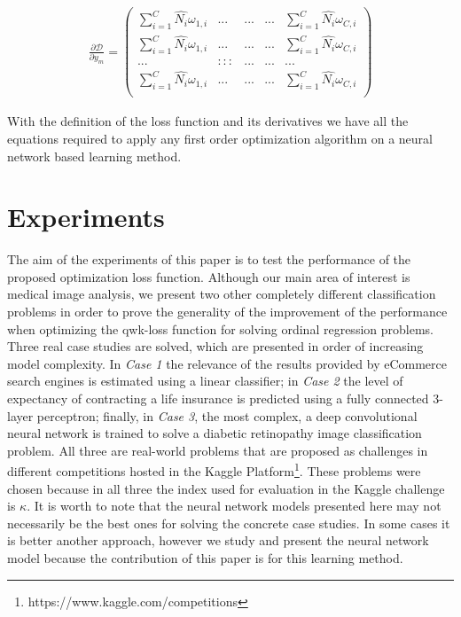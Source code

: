 \documentclass[times,twocolumn,final,authoryear]{elsarticle}
\begin{document}
\begin{equation}
\begin{aligned}
\frac{\partial \mathcal{D}}{\partial y_m} =
\begin{pmatrix} 
\sum_{i=1}^C \hat{N_i} \omega_{1,i} & ...  & ...     & ... & \sum_{i=1}^C \hat{N_i} \omega_{C,i}\\
\sum_{i=1}^C \hat{N_i} \omega_{1,i} & ...  & ...     & ... & \sum_{i=1}^C \hat{N_i} \omega_{C,i}\\
... & ::: & ... & ... & ...\\
\sum_{i=1}^C \hat{N_i} \omega_{1,i} & ...  & ...     & ... & \sum_{i=1}^C \hat{N_i} \omega_{C,i}\\ 
\end{pmatrix}
\end{aligned}
\end{equation}

With the definition of the loss function and its derivatives we have all the equations required to apply any first order optimization algorithm on a neural network based learning method. 

\section{Experiments}

The aim of the experiments of this paper is to test the performance of the proposed optimization loss function. Although our main area of interest is medical image analysis, we present two other completely different classification problems in order to prove the generality of the improvement of the performance when optimizing the qwk-loss function for solving ordinal regression problems. Three real case studies are solved, which are presented in order of increasing model complexity. In \emph{Case 1} the relevance of the results provided by eCommerce search engines is estimated using a linear classifier; in \emph{Case 2} the level of expectancy of contracting a life insurance is predicted using a fully connected 3-layer perceptron; finally, in \emph{Case 3}, the most complex, a deep convolutional neural network is trained to solve a diabetic retinopathy image classification problem. All three are real-world problems that are proposed as challenges in different competitions hosted in the Kaggle Platform\footnote{https://www.kaggle.com/competitions}.
These problems were chosen because in all three the index used for evaluation in the Kaggle challenge is $\kappa$. It is worth to note that the neural network models presented here may not necessarily be the best ones for solving the concrete case studies. In some cases it is better another approach, however we study and present the neural network model because the contribution of this paper is for this learning method.
\end{document}
